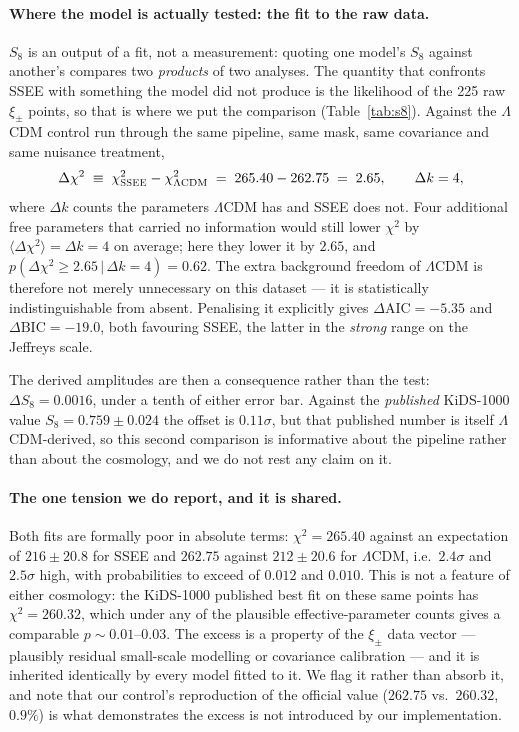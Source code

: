 \documentclass[12pt,a4paper]{article}
\newcommand{\SSEE}{\textsc{SSEE}}
\begin{document}
\paragraph{Where the model is actually tested: the fit to the raw data.}
$S_8$ is an output of a fit, not a measurement: quoting one model's $S_8$
against another's compares two \emph{products} of two analyses. The
quantity that confronts \SSEE{} with something the model did not produce is
the likelihood of the 225 raw $\xi_\pm$ points, so that is where we put the
comparison (Table~\ref{tab:s8}). Against the $\Lambda$CDM control run
through the same pipeline, same mask, same covariance and same nuisance
treatment,
\begin{equation}
\Delta\chi^2 \;\equiv\; \chi^2_{\SSEE{}}-\chi^2_{\Lambda\rm CDM}
\;=\; 265.40-262.75 \;=\; 2.65 ,
\qquad \Delta k = 4 ,
\label{eq:dchi2}
\end{equation}
where $\Delta k$ counts the parameters $\Lambda$CDM has and \SSEE{} does not.
Four additional free parameters that carried no information would still
lower $\chi^2$ by $\langle\Delta\chi^2\rangle=\Delta k=4$ on average; here
they lower it by $2.65$, and $p(\Delta\chi^2\ge 2.65\,|\,\Delta k=4)=0.62$.
The extra background freedom of $\Lambda$CDM is therefore not merely
unnecessary on this dataset --- it is statistically indistinguishable from
absent. Penalising it explicitly gives $\Delta\mathrm{AIC}=-5.35$ and
$\Delta\mathrm{BIC}=-19.0$, both favouring \SSEE{}, the latter in the
\emph{strong} range on the Jeffreys scale.

The derived amplitudes are then a consequence rather than the test:
$\Delta S_8 = 0.0016$, under a tenth of either error bar. Against the
\emph{published} KiDS-1000 value $S_8=0.759\pm0.024$ the offset is
$0.11\sigma$, but that published number is itself $\Lambda$CDM-derived, so
this second comparison is informative about the pipeline rather than about
the cosmology, and we do not rest any claim on it.

\paragraph{The one tension we do report, and it is shared.} Both fits are
formally poor in absolute terms: $\chi^2=265.40$ against an expectation of
$216\pm20.8$ for \SSEE{} and $262.75$ against $212\pm20.6$ for
$\Lambda$CDM, i.e.\ $2.4\sigma$ and $2.5\sigma$ high, with probabilities to
exceed of $0.012$ and $0.010$. This is not a feature of either cosmology:
the KiDS-1000 published best fit on these same points has
$\chi^2=260.32$, which under any of the plausible effective-parameter counts
gives a comparable $p\sim0.01$--$0.03$. The excess is a property of the
$\xi_\pm$ data vector --- plausibly residual small-scale modelling or
covariance calibration --- and it is inherited identically by every model
fitted to it. We flag it rather than absorb it, and note that our control's
reproduction of the official value ($262.75$ vs.\ $260.32$, $0.9\%$) is what
demonstrates the excess is not introduced by our implementation.
\end{document}
